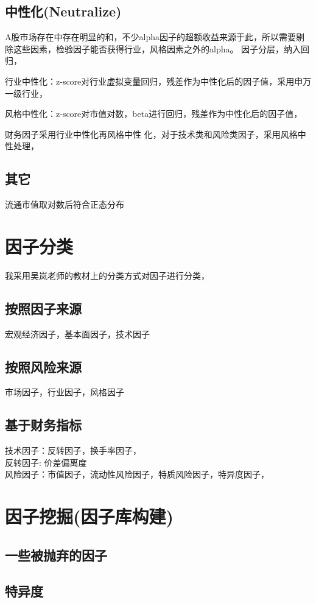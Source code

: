 \documentclass[12pt]{article}
\begin{document}
\subsection{中性化(Neutralize)}
A股市场存在中存在明显的和，不少alpha因子的超额收益来源于此，所以需要剔除这些因素，检验因子能否获得行业，风格因素之外的alpha。
因子分层，纳入回归，\par
行业中性化：z-score对行业虚拟变量回归，残差作为中性化后的因子值，采用申万一级行业，\par
风格中性化：z-score对市值对数，beta进行回归，残差作为中性化后的因子值，\par
财务因子采用行业中性化再风格中性         化，对于技术类和风险类因子，采用风格中性处理，

\subsection{其它}
流通市值取对数后符合正态分布


\section{因子分类}
我采用吴岚老师的教材上的分类方式对因子进行分类，
\subsection{按照因子来源}
宏观经济因子，基本面因子，技术因子
\subsection{按照风险来源}
市场因子，行业因子，风格因子
\subsection{基于财务指标}
技术因子：反转因子，换手率因子， \\
反转因子: 价差偏离度 \\
风险因子：市值因子，流动性风险因子，特质风险因子，特异度因子，\\

\section{因子挖掘(因子库构建)}
\subsection{一些被抛弃的因子}
\subsection{特异度}
\end{document}
